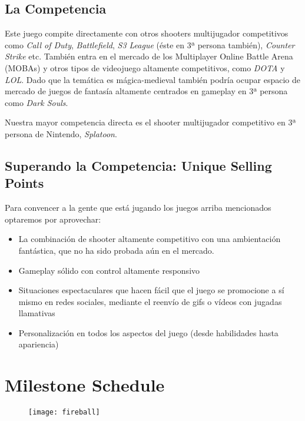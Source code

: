 \documentclass[12pt]{article}
\begin{document}
\subsection{La Competencia}
Este juego compite directamente con otros shooters multijugador competitivos como \textit{Call of Duty}, \textit{Battlefield}, \textit{S3 League} (éste en 3ª persona también), \textit{Counter Strike} etc. También entra en el mercado de los Multiplayer Online Battle Arena (MOBAs) y otros tipos de videojuego altamente competitivos, como \textit{DOTA} y \textit{LOL}. Dado que la temática es mágica-medieval también podría ocupar espacio de mercado de juegos de fantasía altamente centrados en gameplay en 3ª persona como \textit{Dark Souls}.

Nuestra mayor competencia directa es el shooter multijugador competitivo en 3ª persona de Nintendo, \textit{Splatoon}. 

\subsection{Superando la Competencia: Unique Selling Points}
Para convencer a la gente que está jugando los juegos arriba mencionados optaremos por aprovechar:

\begin{itemize}
\item La combinación de shooter altamente competitivo con una ambientación fantástica, que no ha sido probada aún en el mercado.
\item Gameplay sólido con control altamente responsivo
\item Situaciones espectaculares que hacen fácil que el juego se promocione a sí mismo en redes sociales, mediante el reenvío de gifs o vídeos con jugadas llamativas
\item Personalización en todos los aspectos del juego (desde habilidades hasta apariencia)
\end{itemize}

\newpage

\section{Milestone Schedule}

\cleardoublepage

\thispagestyle{empty}

\vspace*{\fill}

\begin{figure}[h]
    \centering
    \texttt{[image: fireball]}
\end{figure}

\vfill
\end{document}
